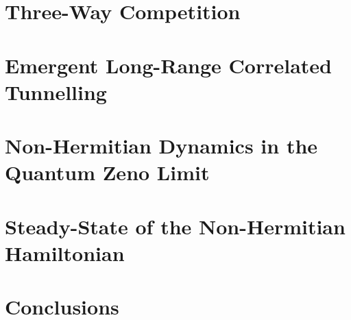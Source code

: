 \section{Three-Way Competition}

\section{Emergent Long-Range Correlated Tunnelling}

\section{Non-Hermitian Dynamics in the Quantum Zeno Limit}


\section{Steady-State of the Non-Hermitian Hamiltonian}

\section{Conclusions}